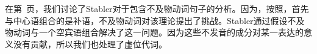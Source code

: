 \noindent
在第~\pageref{Beispiel-leeres-Element-intransitive-Verben}页，我们讨论了Stabler对于包含不及物动词句子的分析。因为，按照\citet[]{Chomsky2008a}，首先与中心语组合的是补语，不及物动词对该理论提出了挑战。Stabler通过假设不及物动词与一个空宾语组合解决了这一问题\citep[,124]{Veenstra98a}。因为这些不发音的成分对某一表达的意义没有贡献，所以我们也处理了虚位代词。

